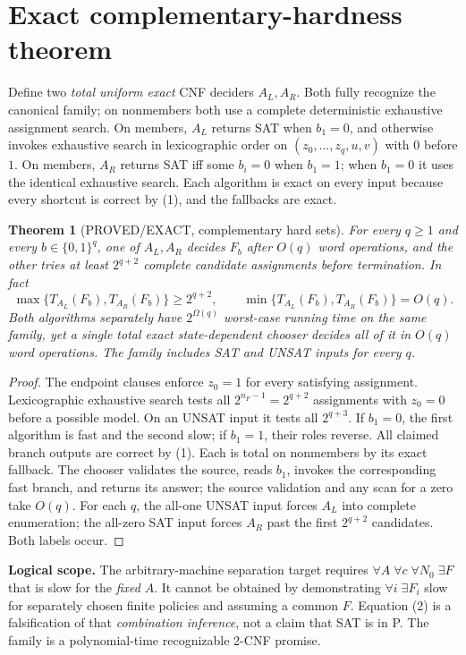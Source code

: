 \documentclass[11pt]{article}
\newtheorem{theorem}{Theorem}
\begin{document}
\section{Exact complementary-hardness theorem}
Define two \emph{total uniform exact} CNF deciders $A_L,A_R$.
Both fully recognize the canonical family; on nonmembers both use
a complete deterministic exhaustive assignment search.
On members, $A_L$ returns SAT when $b_1=0$, and otherwise invokes
exhaustive search in lexicographic order on
$(z_0,\ldots,z_q,u,v)$ with $0$ before $1$.
On members, $A_R$ returns SAT iff some $b_i=0$ when $b_1=1$;
when $b_1=0$ it uses the identical exhaustive search.
Each algorithm is exact on every input because every shortcut is
correct by (1), and the fallbacks are exact.

\begin{theorem}[PROVED/EXACT, complementary hard sets]
For \emph{every} $q\ge1$ and \emph{every} $b\in\{0,1\}^q$,
one of $A_L,A_R$ decides $F_b$ after $O(q)$ word operations,
and the other tries at least $2^{q+2}$ complete candidate
assignments before termination. In fact
\[
\max\{T_{A_L}(F_b),T_{A_R}(F_b)\}\ge 2^{q+2},
\qquad
\min\{T_{A_L}(F_b),T_{A_R}(F_b)\}=O(q).
\tag{2}
\]
Both algorithms separately have $2^{\Omega(q)}$ worst-case
running time on the \emph{same} family, yet a single total exact
state-dependent chooser decides all of it in $O(q)$ word operations.
The family includes SAT and UNSAT inputs for every $q$.
\end{theorem}
\begin{proof}
The endpoint clauses enforce $z_0=1$ for every satisfying assignment.
Lexicographic exhaustive search tests all $2^{n_F-1}=2^{q+2}$
assignments with $z_0=0$ before a possible model. On an
UNSAT input it tests all $2^{q+3}$. If $b_1=0$, the first algorithm
is fast and the second slow; if $b_1=1$, their roles reverse.
All claimed branch outputs are correct by (1). Each is total on
nonmembers by its exact fallback. The chooser validates the source,
reads $b_1$, invokes the corresponding fast branch, and returns its
answer; the source validation and any scan for a zero take $O(q)$.
For each $q$, the all-one UNSAT input forces $A_L$ into complete
enumeration; the all-zero SAT input forces $A_R$ past the first
$2^{q+2}$ candidates. Both labels occur.
\end{proof}
\noindent\textbf{Logical scope.} The arbitrary-machine separation target
requires $\forall A\;\forall c\;\forall N_0\;\exists F$ that is slow
for the \emph{fixed} $A$. It cannot be obtained by demonstrating
$\forall i\;\exists F_i$ slow for separately chosen finite policies
and assuming a common $F$. Equation (2) is a falsification of that
\emph{combination inference}, not a claim that SAT is in P.
The family is a polynomial-time recognizable 2-CNF promise.
\end{document}
